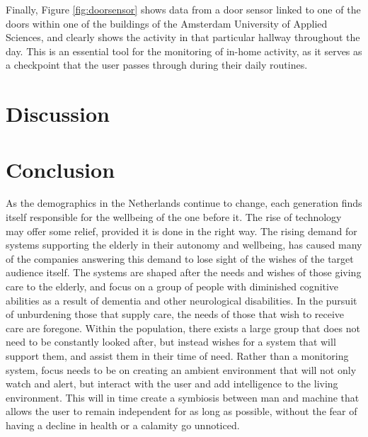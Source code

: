 \documentclass{below-ext}
\begin{document}
Finally, Figure \ref{fig:doorsensor} shows data from a door sensor linked to one of the doors within one of the buildings of the Amsterdam University of Applied Sciences, and clearly shows the activity in that particular hallway throughout the day. This is an essential tool for the monitoring of in-home activity, as it serves as a checkpoint that the user passes through during their daily routines.

\section{Discussion}

\section{Conclusion}
As the demographics in the Netherlands continue to change, each generation finds itself responsible for the wellbeing of the one before it. The rise of technology may offer some relief, provided it is done in the right way. The rising demand for systems supporting the elderly in their autonomy and wellbeing, has caused many of the companies answering this demand to lose sight of the wishes of the target audience itself. The systems are shaped after the needs and wishes of those giving care to the elderly, and focus on a group of people with diminished cognitive abilities as a result of dementia and other neurological disabilities. In the pursuit of unburdening those that supply care, the needs of those that wish to receive care are foregone. Within the population, there exists a large group that does not need to be constantly looked after, but instead wishes for a system that will support them, and assist them in their time of need. Rather than a monitoring system, focus needs to be on creating an ambient environment that will not only watch and alert, but interact with the user and add intelligence to the living environment. This will in time create a symbiosis between man and machine that allows the user to remain independent for as long as possible, without the fear of having a decline in health or a calamity go unnoticed.

\end{document}
